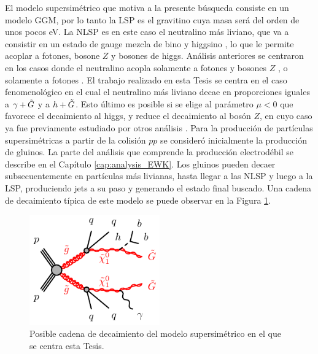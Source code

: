 El modelo supersimétrico que motiva a la presente búsqueda consiste en un modelo GGM, por lo tanto la LSP es el gravitino cuya masa será del orden de unos pocos eV. La NLSP es en este caso el neutralino más liviano, que va a consistir en un estado de gauge mezcla de bino y higgsino
, lo que le permite acoplar a fotones, bosone $Z$ y bosones de higgs.
Análisis anteriores se centraron en los casos donde el neutralino acopla solamente a fotones y bosones $Z$ \cite{tesis_fran, tesis_joaco, Collaboration:2198651}, o solamente a fotones \cite{Jinnouchi:2233741}. El trabajo realizado en esta Tesis se centra en el caso fenomenológico en el cual el neutralino más liviano decae en proporciones iguales a $\gamma+\tilde{G}$ y a $h+\tilde{G}$. Esto último es posible si se elige al parámetro $\mu<0$ que favorece el decaimiento al higgs, y reduce el decaimiento al bosón $Z$, en cuyo caso ya fue previamente estudiado por otros análisis \cite{tesis_fran, tesis_joaco}. Para la producción de partículas supersimétricas a partir de la colisión $pp$ se consideró inicialmente la producción de gluinos. La parte del análisis que comprende la producción electrodébil se describe en el Capítulo \ref{cap:analysis_EWK}. Los gluinos pueden decaer subsecuentemente en partículas más livianas, hasta llegar a las NLSP y luego a la LSP, produciendo jets a su paso y generando el estado final buscado. Una cadena de decaimiento típica de este modelo se puede observar en la Figura \ref{fig:phb_feyn}.

\begin{figure}
  \centering
  \includegraphics[width=0.5\textwidth]{images/analysis/gogo-qqqqbbphGG-h.pdf}
  \caption{Posible cadena de decaimiento del modelo supersimétrico en el que se centra esta Tesis.}
  \label{fig:phb_feyn}
\end{figure}

